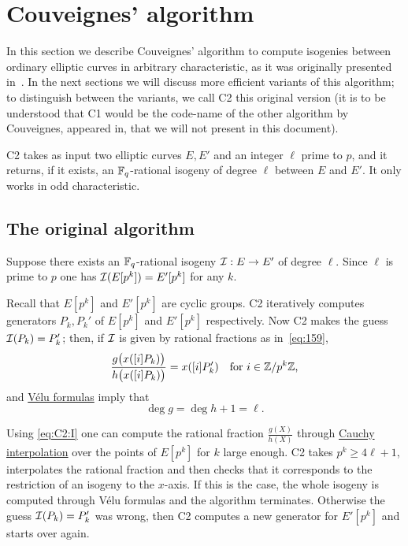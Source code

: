 
\section{Couveignes' algorithm}
\label{sec:C2}

In this section we describe Couveignes' algorithm to compute isogenies
between ordinary elliptic curves in arbitrary characteristic, as it
was originally presented in~\cite{couveignes96}. In the next sections
we will discuss more efficient variants of this algorithm; to
distinguish between the variants, we call C2 this original version (it
is to be understood that C1 would be the code-name of the other
algorithm by Couveignes, appeared in\cite{couveignes94}, that we will
not present in this document).

C2 takes as input two elliptic curves $E, E'$ and an integer $\ell$
prime to $p$, and it returns, if it exists, an $\mathbb{F}_q$-rational isogeny
of degree $\ell$ between $E$ and $E'$. It only works in odd
characteristic.

\subsection{The original algorithm}
Suppose there exists an $\mathbb{F}_q$-rational isogeny
$\mathcal{I}:E\rightarrow E'$ of degree $\ell$. Since $\ell$ is prime to $p$
one has $\mathcal{I}(E[p^k]) = E'[p^k]$ for any $k$.

Recall that $E[p^k]$ and $E'[p^k]$ are cyclic groups. C2 iteratively
computes generators $P_k,P_k'$ of $E[p^k]$ and $E'[p^k]$
respectively. Now C2 makes the guess $\mathcal{I}(P_k) = P_k'$; then, if $\mathcal{I}$
is given by rational fractions as in~\eqref{eq:159},
\begin{equation}
  \label{eq:C2:I}
  \frac{g\bigl(x([i]P_k)\bigr)}{h\bigl(x([i]P_k)\bigr)} = x([i]P_k')
  \quad\text{for $i\in\mathbb{Z}/p^k\mathbb{Z}$,} 
\end{equation}
and \hyperref[sec:velu-formulas]{Vélu formulas} imply that
\begin{equation}
  \label{eq:velu-deg}
  \deg g = \deg h + 1 = \ell
  \text{.}
\end{equation}


Using \eqref{eq:C2:I} one can compute the rational fraction
$\frac{g(X)}{h(X)}$ through \hyperref[sec:eucl-algor-rati]{Cauchy
  interpolation} over the points of $E[p^k]$ for $k$ large enough. C2
takes $p^k \ge 4\ell +1$, interpolates the rational fraction and then
checks that it corresponds to the restriction of an isogeny to the
$x$-axis. If this is the case, the whole isogeny is computed through
Vélu formulas and the algorithm terminates. Otherwise the guess
$\mathcal{I}(P_k) = P_k'$ was wrong, then C2 computes a new generator for
$E'[p^k]$ and starts over again.

